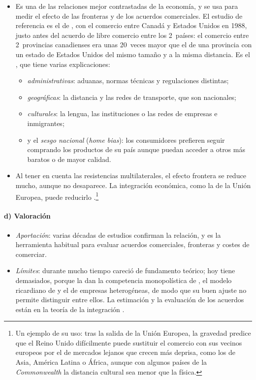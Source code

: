 \documentclass[11pt]{article}
\begin{document}
\begin{itemize}
\item Es una de las relaciones mejor contrastadas de la economía, y se usa para medir el efecto de las fronteras y de los acuerdos comerciales. El estudio de referencia es el de \textcite{McCallum1995National}, con el comercio entre Canadá y Estados Unidos en 1988, justo antes del acuerdo de libre comercio entre los 2~países: el comercio entre 2~provincias canadienses era unas 20~veces mayor que el de una provincia con un estado de Estados Unidos del mismo tamaño y a la misma distancia. Es el , que tiene varias explicaciones:
  \begin{itemize}
  \item \emph{administrativas}: aduanas, normas técnicas y regulaciones distintas;
  \item \emph{geográficas}: la distancia y las redes de transporte, que son nacionales;
  \item \emph{culturales}: la lengua, las instituciones o las redes de empresas e inmigrantes;
  \item y el \emph{sesgo nacional} (\emph{home bias}): los consumidores prefieren seguir comprando los productos de su país aunque puedan acceder a otros más baratos o de mayor calidad.
  \end{itemize}
\item Al tener en cuenta las resistencias multilaterales, el efecto frontera se reduce mucho, aunque no desaparece\nocite{AndersonvanWincoop2003Gravity}. La integración económica, como la de la Unión Europea, puede reducirlo .\footnote{Un ejemplo de su uso: tras la salida de la Unión Europea, la gravedad predice que el Reino Unido difícilmente puede sustituir el comercio con sus vecinos europeos por el de mercados lejanos que crecen más deprisa, como los de Asia, América Latina o África, aunque con algunos países de la \emph{Commonwealth} la distancia cultural sea menor que la física.}
\end{itemize}

\paragraph{d) Valoración}

\begin{itemize}
\item \emph{Aportación}: varias décadas de estudios confirman la relación\nocite{HeadMayer2014Gravity}, y es la herramienta habitual para evaluar acuerdos comerciales, fronteras y costes de comerciar.
\item \emph{Límites}: durante mucho tiempo careció de fundamento teórico; hoy tiene demasiados, porque la dan la competencia monopolística de , el modelo ricardiano de \textcite{EatonKortum2002Technology} y el de empresas heterogéneas\nocite{Chaney2008Distorted}, de modo que su buen ajuste no permite distinguir entre ellos\nocite{ArkolakisCostinotRodriguezClare2012New}. La estimación y la evaluación de los acuerdos están en la teoría de la integración .
\end{itemize}
\end{document}
